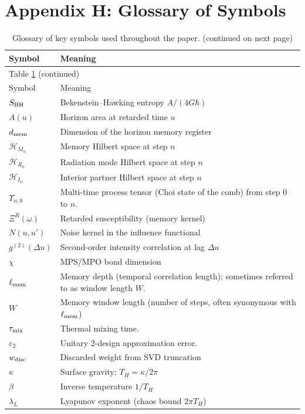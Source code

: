 \documentclass[a4paper,11pt]{article}
\theoremstyle{plain}
\theoremstyle{definition}
\theoremstyle{remark}
\begin{document}
\section{Appendix H: Glossary of Symbols}
\label{app:glossary}
\begin{longtable}{@{}ll@{}}
\caption{Glossary of key symbols used throughout the paper. (continued on next page)}
\label{tab:glossary}\\
\toprule
Symbol & Meaning \\
\midrule
\endfirsthead
\multicolumn{2}{l}{Table \ref{tab:glossary} (continued)}\\
\toprule
Symbol & Meaning \\
\midrule
\endhead
$S_{\rm BH}$ & Bekenstein--Hawking entropy $A/(4G\hbar)$ \\
$A(u)$ & Horizon area at retarded time $u$ \\
$d_{\rm mem}$ & Dimension of the horizon memory register \\
$\mathcal{H}_{M_n}$ & Memory Hilbert space at step $n$ \\
$\mathcal{H}_{R_n}$ & Radiation mode Hilbert space at step $n$ \\
$\mathcal{H}_{I_n}$ & Interior partner Hilbert space at step $n$ \\
$\Upsilon_{n{:}0}$ & Multi-time process tensor (Choi state of the comb) from step 0 to $n$. \\
$\Xi^R(\omega)$ & Retarded susceptibility (memory kernel) \\
$N(u,u')$ & Noise kernel in the influence functional \\
$g^{(2)}(\Delta u)$ & Second-order intensity correlation at lag $\Delta u$ \\
$\chi$ & MPS/MPO bond dimension \\
$\ell_{\rm mem}$ & Memory depth (temporal correlation length); sometimes referred to as window length $W$. \\
$W$ & Memory window length (number of steps, often synonymous with $\ell_{\rm mem}$) \\
$\tau_{\rm mix}$ & Thermal mixing time. \\
$\varepsilon_2$ & Unitary 2-design approximation error. \\
$w_{\rm disc}$ & Discarded weight from SVD truncation \\
$\kappa$ & Surface gravity; $T_H=\kappa/2\pi$ \\
$\beta$ & Inverse temperature $1/T_H$ \\
$\lambda_L$ & Lyapunov exponent (chaos bound $2\pi T_H$) \\
\bottomrule
\end{longtable}
\end{document}
